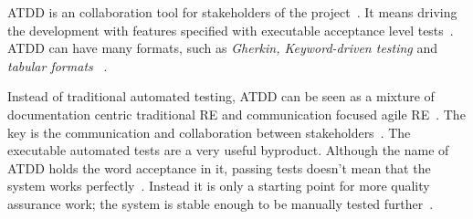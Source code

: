     ATDD is an collaboration tool for stakeholders of the project~\cite{gartner2012atdd,haugset2012automated}. It means driving the
    development with features specified with executable acceptance level tests~\cite{gartner2012atdd,haugset2012automated}.
    ATDD can have many formats, such as \textit{Gherkin, Keyword-driven testing} and \textit{tabular formats} ~\cite{gartner2012atdd}.

    Instead of traditional automated testing, ATDD can be seen as a mixture of documentation centric traditional RE and communication focused agile RE~\cite{haugset2012automated}.
    The key is the communication and collaboration between stakeholders~\cite{haugset2012automated}. The executable automated tests are a very useful byproduct.
    Although the name of ATDD holds the word acceptance in it, passing tests doesn't mean that the system works perfectly~\cite{gartner2012atdd}. Instead it is
    only a starting point for more quality assurance work; the system is stable enough to be manually tested further~\cite{acceptance2010}.

